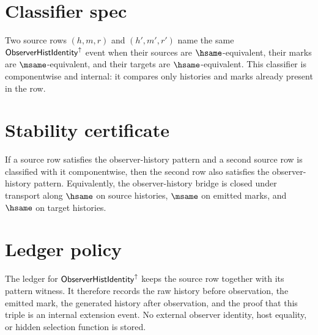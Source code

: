 \section{Classifier spec}
\label{sec:concrete-instances-observer-hist-identity-classifier}

\begin{definition}
\label{def:concrete-instances-observer-hist-identity-classifier}
Two source rows $(h,m,r)$ and $(h',m',r')$ name the same $\mathsf{ObserverHistIdentity}^{\uparrow}$ event when their sources are $\hsame$-equivalent, their marks are $\msame$-equivalent, and their targets are $\hsame$-equivalent. This classifier is componentwise and internal: it compares only histories and marks already present in the row.
\end{definition}

\section{Stability certificate}
\label{sec:concrete-instances-observer-hist-identity-stability}

\begin{theorem}
\label{thm:concrete-instances-observer-hist-identity-stability}
If a source row satisfies the observer-history pattern and a second source row is classified with it componentwise, then the second row also satisfies the observer-history pattern. Equivalently, the observer-history bridge is closed under transport along $\hsame$ on source histories, $\msame$ on emitted marks, and $\hsame$ on target histories.
\end{theorem}

\section{Ledger policy}
\label{sec:concrete-instances-observer-hist-identity-ledger}

\begin{definition}
\label{def:concrete-instances-observer-hist-identity-ledger}
The ledger for $\mathsf{ObserverHistIdentity}^{\uparrow}$ keeps the source row together with its pattern witness. It therefore records the raw history before observation, the emitted mark, the generated history after observation, and the proof that this triple is an internal extension event. No external observer identity, host equality, or hidden selection function is stored.
\end{definition}

